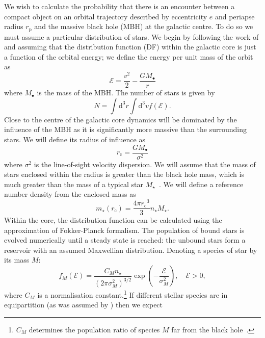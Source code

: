 \documentclass[useAMS,usedcolumn,usegraphicx,usenatbib]{mn2e}
\newcommand{\sub}[1]{\ensuremath{_\mathrm{#1}}}
\newcommand{\dd}{\ensuremath{\mathrm{d}}}
\begin{document}
We wish to calculate the probability that there is an encounter between a compact object on an orbital trajectory described by eccentricity $e$ and periapse radius $r\sub{p}$ and the massive black hole (MBH) at the galactic centre. To do so we must assume a particular distribution of stars. We begin by following the work of \citet{Bahcall1976, Bahcall1977} and assuming that the distribution function (DF) within the galactic core is just a function of the orbital energy; we define the energy per unit mass of the orbit as
\begin{equation}
\mathcal{E} = \frac{v^2}{2} - \frac{GM_\bullet}{r}
\end{equation}
where $M_\bullet$ is the mass of the MBH. The number of stars is given by
\begin{equation}
N = \int \dd^3r \int \dd^3v f(\mathcal{E}).
\end{equation}
Close to the centre of the galactic core dynamics will be dominated by the influence of the MBH as it is significantly more massive than the surrounding stars. We will define its radius of influence as~\citep{Frank1976}
\begin{equation}
r\sub{c} = \frac{GM_\bullet}{\sigma^2}
\label{eq:r_c}
\end{equation}
where $\sigma^2$ is the line-of-sight velocity dispersion. We will assume that the mass of stars enclosed within the radius is greater than the black hole mass, which is much greater than the mass of a typical star $M_\star$~\citep{Bahcall1976}. We will define a reference number density from the enclosed mass as
\begin{equation}
m_\star(r\sub{c}) = \frac{4\pi r\sub{c}^3}{3}n_\star M_\star.
\end{equation}
Within the core, the distribution function can be calculated using the approximation of Fokker-Planck formalism. The population of bound stars is evolved numerically until a steady state is reached: the unbound stars form a reservoir with an assumed Maxwellian distribution. Denoting a species of star by its mass $M$:
\begin{equation}
f_M(\mathcal{E}) = \frac{C_M n_\star}{(2\pi\sigma_M^2)^{3/2}} \exp\left(-\frac{\mathcal{E}}{\sigma_M^2}\right),\quad\mathcal{E} > 0,
\label{eq:Unbound_DF}
\end{equation}
where $C_M$ is a normalisation constant.\footnote{$C_M$ determines the population ratio of species $M$ far from the black hole~\citep{Alexander2009}.} If different stellar species are in equipartition (as was assumed by \citealt{Bahcall1976, Bahcall1977}) then we expect
\end{document}
